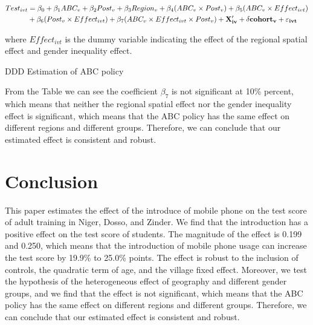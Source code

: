 \documentclass[12pt]{jfm}
\begin{document}
\begin{equation}
  \begin{aligned}
  Test_{ivt} & = \beta_0 + \beta_1 ABC_{v} + \beta_2 Post_{v} + \beta_3 Region_{v} + \beta_4 (ABC_v \times Post_v) + \beta_5 (ABC_v \times Effect_{ivt}) \\
  & + \beta_6 (Post_v \times Effect_{ivt}) + \beta_7 (ABC_v \times Effect_{ivt} \times Post_v) + \bf{X}_{iv}^\prime + \delta cohort_{v} + \varepsilon_{ivt}  \label{eq:ddd}
  \end{aligned}
\end{equation}

where $Effect_{ivt}$ is the dummy variable indicating the effect of the regional spatial effect and gender inequality effect.

\begin{table}
  \begin{center}
    \begin{footnotesize}
    \caption{DDD Estimation of ABC policy}
    \label{tab:ddd}
    
    \end{footnotesize}
  \end{center}
\end{table}

From the Table we can see the coefficient $\beta_7$ is not significant at 10\% percent, which means that neither the regional spatial effect nor the gender inequality effect is significant, which means that the ABC policy has the same effect on different regions and different groups. Therefore, we can conclude that our estimated effect is consistent and robust.

\section{Conclusion} \label{sec:conclusion}

This paper estimates the effect of the introduce of mobile phone on the test score of adult training in Niger, Dosso, and Zinder. We find that the introduction has a positive effect on the test score of students. The magnitude of the effect is 0.199 and 0.250, which means that the introduction of mobile phone usage can increase the test score by 19.9\% to 25.0\% points. The effect is robust to the inclusion of controls, the quadratic term of age, and the village fixed effect. Moreover, we test the hypothesis of the heterogeneous effect of geography and different gender groups, and we find that the effect is not significant, which means that the ABC policy has the same effect on different regions and different groups. Therefore, we can conclude that our estimated effect is consistent and robust.
\end{document}
